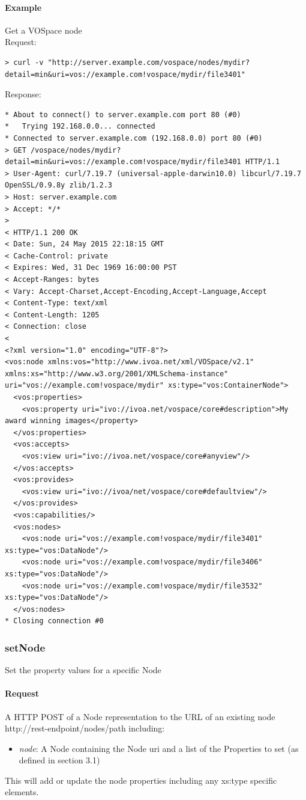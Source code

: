 \documentclass[11pt,a4paper]{ivoa}
\begin{document}
\paragraph{Example}
Get a VOSpace node
\\[5px]
\noindent
Request:
\begin{lstlisting}
> curl -v "http://server.example.com/vospace/nodes/mydir?detail=min&uri=vos://example.com!vospace/mydir/file3401"
\end{lstlisting}
Response:
\begin{lstlisting}
* About to connect() to server.example.com port 80 (#0)
*   Trying 192.168.0.0... connected
* Connected to server.example.com (192.168.0.0) port 80 (#0)
> GET /vospace/nodes/mydir?detail=min&uri=vos://example.com!vospace/mydir/file3401 HTTP/1.1
> User-Agent: curl/7.19.7 (universal-apple-darwin10.0) libcurl/7.19.7 OpenSSL/0.9.8y zlib/1.2.3
> Host: server.example.com
> Accept: */*
>
< HTTP/1.1 200 OK
< Date: Sun, 24 May 2015 22:18:15 GMT
< Cache-Control: private
< Expires: Wed, 31 Dec 1969 16:00:00 PST
< Accept-Ranges: bytes
< Vary: Accept-Charset,Accept-Encoding,Accept-Language,Accept
< Content-Type: text/xml
< Content-Length: 1205
< Connection: close
<
<?xml version="1.0" encoding="UTF-8"?>
<vos:node xmlns:vos="http://www.ivoa.net/xml/VOSpace/v2.1" xmlns:xs="http://www.w3.org/2001/XMLSchema-instance" uri="vos://example.com!vospace/mydir" xs:type="vos:ContainerNode">
  <vos:properties>
    <vos:property uri="ivo://ivoa.net/vospace/core#description">My award winning images</property>
  </vos:properties>
  <vos:accepts>
    <vos:view uri="ivo://ivoa.net/vospace/core#anyview"/>
  </vos:accepts>
  <vos:provides>
    <vos:view uri="ivo://ivoa/net/vospace/core#defaultview"/>
  </vos:provides>
  <vos:capabilities/>
  <vos:nodes>
    <vos:node uri="vos://example.com!vospace/mydir/file3401" xs:type="vos:DataNode"/>
    <vos:node uri="vos://example.com!vospace/mydir/file3406" xs:type="vos:DataNode"/>
    <vos:node uri="vos://example.com!vospace/mydir/file3532" xs:type="vos:DataNode"/>
  </vos:nodes>
* Closing connection #0
\end{lstlisting}

\subsubsection{setNode}
\label{subsubsec:setnode}
Set the property values for a specific Node

\paragraph{Request}
A HTTP POST of a Node representation to the URL of an existing node http://rest-endpoint/nodes/path including:
\begin{itemize}
    \item \emph{node}: A Node containing the Node uri and a list of the Properties to set (as defined in section 3.1)
\end{itemize}
This will add or update the node properties including any xs:type specific elements.
\end{document}
